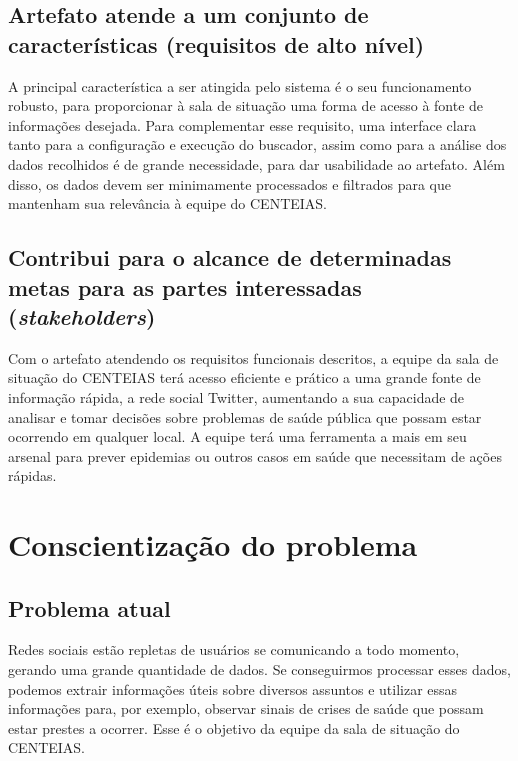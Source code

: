 \documentclass[12pt]{article}
\begin{document}
	
	
	\subsection{Artefato atende a um conjunto de características (requisitos de alto nível)\label{requisitos:alto:nivel}}
	
	A principal característica a ser atingida pelo sistema é o seu funcionamento robusto, para proporcionar à sala de situação uma forma de acesso à fonte de informações desejada. Para complementar esse requisito, uma interface clara tanto para a configuração e execução do buscador, assim como para a análise dos dados recolhidos é de grande necessidade, para dar usabilidade ao artefato. Além disso, os dados devem ser minimamente processados e filtrados para que mantenham sua relevância à equipe do CENTEIAS.
	

	\subsection{Contribui para o alcance de determinadas metas para as partes interessadas (\textit{stakeholders})\label{metas:stakeholders}}
	
	Com o artefato atendendo os requisitos funcionais descritos, a equipe da sala de situação do CENTEIAS terá acesso eficiente e prático a uma grande fonte de informação rápida, a rede social Twitter, aumentando a sua capacidade de analisar e tomar decisões sobre problemas de saúde pública que possam estar ocorrendo em qualquer local. A equipe terá uma ferramenta a mais em seu arsenal para prever epidemias ou outros casos em saúde que necessitam de ações rápidas.
	
	
    
	\section{Conscientização do problema\label{Sec:CP:ConscientizProblema}}
	
	
	
	\subsection{Problema atual}
	
	Redes sociais estão repletas de usuários se comunicando a todo momento, gerando uma grande quantidade de dados. Se conseguirmos processar esses dados, podemos extrair informações úteis sobre diversos assuntos e utilizar essas informações para, por exemplo, observar sinais de crises de saúde que possam estar prestes a ocorrer. Esse é o objetivo da equipe da sala de situação do CENTEIAS.
	
\end{document}

